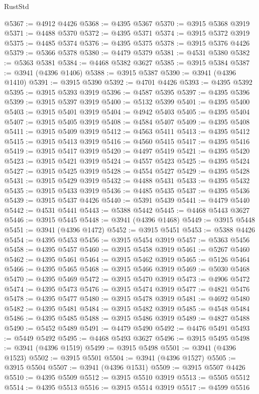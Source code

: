 \begin{lexlean}{RustStd}
\begin{coremodule}
@5367 := @4912 @4426
@5368 := @4395 @5367
@5370 := @3915 @5368 @3919
@5371 := @4488 @5370
@5372 := @4395 @5371
@5374 := @3915 @5372 @3919
@5375 := @4485 @5374
@5376 := @4395 @5375
@5378 := @3915 @5376 @4426
@5379 := @5366 @5378
@5380 := @4479 @5379
@5381 := @4531 @5380
@5382 := @5363 @5381
@5384 := @4468 @5382 @3627
@5385 := @3915 @5384
@5387 := @3941 (@4396 @1406)
@5388 := @3915 @5387
@5390 := @3941 (@4396 @1410)
@5391 := @3915 @5390
@5392 := @4701 @4426
@5393 := @4395 @5392
@5395 := @3915 @5393 @3919
@5396 := @4587 @5395
@5397 := @4395 @5396
@5399 := @3915 @5397 @3919
@5400 := @5132 @5399
@5401 := @4395 @5400
@5403 := @3915 @5401 @3919
@5404 := @4942 @5403
@5405 := @4395 @5404
@5407 := @3915 @5405 @3919
@5408 := @4584 @5407
@5409 := @4395 @5408
@5411 := @3915 @5409 @3919
@5412 := @4563 @5411
@5413 := @4395 @5412
@5415 := @3915 @5413 @3919
@5416 := @4560 @5415
@5417 := @4395 @5416
@5419 := @3915 @5417 @3919
@5420 := @4497 @5419
@5421 := @4395 @5420
@5423 := @3915 @5421 @3919
@5424 := @4557 @5423
@5425 := @4395 @5424
@5427 := @3915 @5425 @3919
@5428 := @4554 @5427
@5429 := @4395 @5428
@5431 := @3915 @5429 @3919
@5432 := @4488 @5431
@5433 := @4395 @5432
@5435 := @3915 @5433 @3919
@5436 := @4485 @5435
@5437 := @4395 @5436
@5439 := @3915 @5437 @4426
@5440 := @5391 @5439
@5441 := @4479 @5440
@5442 := @4531 @5441
@5443 := @5388 @5442
@5445 := @4468 @5443 @3627
@5446 := @3915 @5445
@5448 := @3941 (@4396 @1468)
@5449 := @3915 @5448
@5451 := @3941 (@4396 @1472)
@5452 := @3915 @5451
@5453 := @5388 @4426
@5454 := @4395 @5453
@5456 := @3915 @5454 @3919
@5457 := @5363 @5456
@5458 := @4395 @5457
@5460 := @3915 @5458 @3919
@5461 := @5267 @5460
@5462 := @4395 @5461
@5464 := @3915 @5462 @3919
@5465 := @5126 @5464
@5466 := @4395 @5465
@5468 := @3915 @5466 @3919
@5469 := @5030 @5468
@5470 := @4395 @5469
@5472 := @3915 @5470 @3919
@5473 := @4906 @5472
@5474 := @4395 @5473
@5476 := @3915 @5474 @3919
@5477 := @4821 @5476
@5478 := @4395 @5477
@5480 := @3915 @5478 @3919
@5481 := @4692 @5480
@5482 := @4395 @5481
@5484 := @3915 @5482 @3919
@5485 := @4548 @5484
@5486 := @4395 @5485
@5488 := @3915 @5486 @3919
@5489 := @4827 @5488
@5490 := @5452 @5489
@5491 := @4479 @5490
@5492 := @4476 @5491
@5493 := @5449 @5492
@5495 := @4468 @5493 @3627
@5496 := @3915 @5495
@5498 := @3941 (@4396 @1519)
@5499 := @3915 @5498
@5501 := @3941 (@4396 @1523)
@5502 := @3915 @5501
@5504 := @3941 (@4396 @1527)
@5505 := @3915 @5504
@5507 := @3941 (@4396 @1531)
@5509 := @3915 @5507 @4426
@5510 := @4395 @5509
@5512 := @3915 @5510 @3919
@5513 := @5505 @5512
@5514 := @4395 @5513
@5516 := @3915 @5514 @3919
@5517 := @4599 @5516

\end{coremodule}
\end{lexlean}
